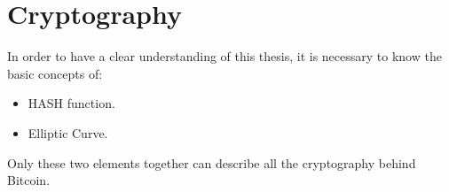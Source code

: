 
\chapter{Cryptography} %

\label{EC} %


\newcommand{\keyword}[1]{\textbf{#1}}
\newcommand{\tabhead}[1]{\textbf{#1}}
\newcommand{\code}[1]{\texttt{#1}}
\newcommand{\file}[1]{\texttt{\bfseries#1}}
\newcommand{\option}[1]{\texttt{\itshape#1}}


In order to have a clear understanding of this thesis, it is necessary to know the basic concepts of:
\begin{itemize}[label=$\checkmark$]
	\item HASH function.
	\item Elliptic Curve.
\end{itemize}
Only these two elements together can describe all the cryptography behind Bitcoin.

